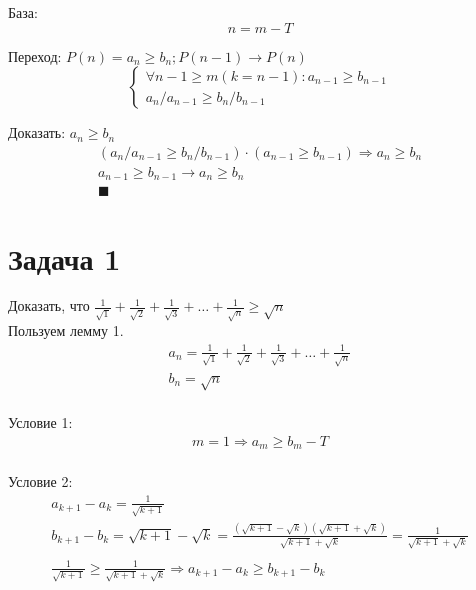 \documentclass[letterpaper]{article}
\begin{document}
База:\\
\begin{equation}
n = m - T
\end{equation}

Переход: \(P(n) = a_n \geq b_n; P(n - 1) \rightarrow P(n)\)\\
\begin{equation}
\begin{cases}
\forall n - 1 \geq m (k = n - 1): a_{n-1} \geq b_{n-1} \\
a_n / a_{n-1} \geq b_n / b_{n-1}
\end{cases}
\end{equation}

Доказать: \(a_n \geq b_n\)\\

\begin{equation}
\begin{aligned}
(a_n / a_{n-1} \geq b_n / b_{n-1}) \cdot (a_{n-1} \geq b_{n-1}) \Rightarrow  a_n \geq b_n \\
a_{n-1} \geq b_{n-1} \rightarrow a_n \geq b_n \\
\blacksquare
\end{aligned}
\end{equation}
\section{Задача 1}
\label{sec:org7238bbe}
Доказать, что \(\frac{1}{\sqrt{1}} + \frac{1}{\sqrt{2}} + \frac{1}{\sqrt{3}} + \ldots + \frac{1}{\sqrt{n}} \geq \sqrt{n}\)\\

Пользуем лемму 1.\\
\begin{equation}
\begin{aligned}
a_n = \frac{1}{\sqrt{1}} + \frac{1}{\sqrt{2}} + \frac{1}{\sqrt{3}} + \ldots + \frac{1}{\sqrt{n}} \\
b_n = \sqrt{n} \\
\end{aligned}
\end{equation}

Условие 1:\\
\begin{equation}
\begin{aligned}
m = 1 \Rightarrow a_m \geq b_m - T \\
\end{aligned}
\end{equation}

Условие 2:\\
\begin{equation}
\begin{aligned}
a_{k+1} - a_k = \frac{1}{\sqrt{k + 1}} \\
b_{k+1} - b_k = \sqrt{k + 1} - \sqrt{k} = \frac{(\sqrt{k + 1} - \sqrt{k})(\sqrt{k + 1} + \sqrt{k})}{\sqrt{k + 1} + \sqrt{k}} = \frac{1}{\sqrt{k + 1} + \sqrt{k}} \\ \\
\frac{1}{\sqrt{k + 1}} \geq \frac{1}{\sqrt{k + 1} + \sqrt{k}} \Rightarrow a_{k+1} - a_k \geq b_{k+1} - b_k
\end{aligned}
\end{equation}
\end{document}
